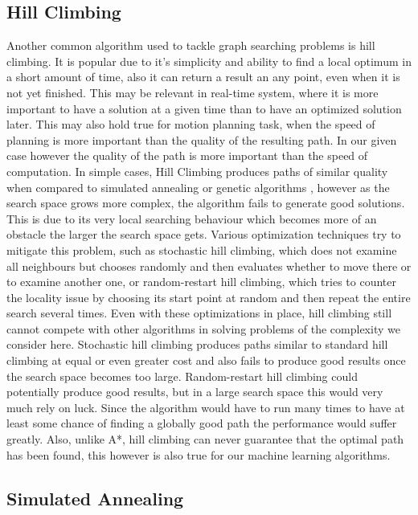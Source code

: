\subsection{Hill Climbing}
\label{sec:hill_climbing}

Another common algorithm used to tackle graph searching problems is hill climbing. It is popular due to it's simplicity and ability to find a local optimum in a short amount of time, also it can return a result an any point, even when it is not yet finished. This may be relevant in real-time system, where it is more important to have a solution at a given time than to have an optimized solution later. This may also hold true for motion planning task, when the speed of planning is more important than the quality of the resulting path. In our given case however the quality of the path is more important than the speed of computation. In simple cases, Hill Climbing produces paths of similar quality when compared to simulated annealing or genetic algorithms \cite{8}, however as the search space grows more complex, the algorithm fails to generate good solutions. This is due to its very local searching behaviour which becomes more of an obstacle the larger the search space gets. Various optimization techniques try to mitigate this problem, such as stochastic hill climbing, \label{sec:stochastic_hill_climbing} which does not examine all neighbours but chooses randomly and then evaluates whether to move there or to examine another one, or random-restart hill climbing, which tries to counter the locality issue by choosing its start point at random and then repeat the entire search several times. Even with these optimizations in place, hill climbing still cannot compete with other algorithms in solving problems of the complexity we consider here. Stochastic hill climbing produces paths similar to standard hill climbing at equal or even greater cost \cite{8} and also fails to produce good results once the search space becomes too large. Random-restart hill climbing could potentially produce good results, but in a large search space this would very much rely on luck. Since the algorithm would have to run many times to have at least some chance of finding a globally good path the performance would suffer greatly. Also, unlike A*, hill climbing can never guarantee that the optimal path has been found, this however is also true for our machine learning algorithms.

\subsection{Simulated Annealing}
\label{sec:simulated_annealing}

